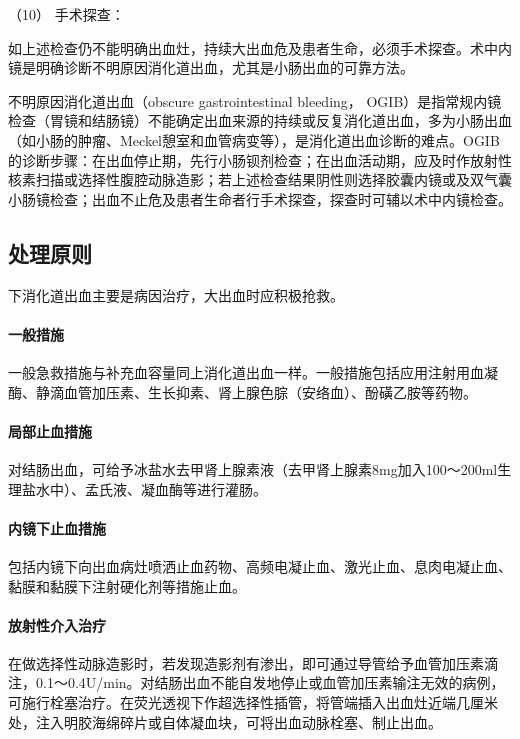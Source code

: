 \hypertarget{text00033.htmlux5cux23CHP1-13-2-1-5-10}{}
（10） 手术探查：

如上述检查仍不能明确出血灶，持续大出血危及患者生命，必须手术探查。术中内镜是明确诊断不明原因消化道出血，尤其是小肠出血的可靠方法。

不明原因消化道出血（obscure gastrointestinal bleeding，
OGIB）是指常规内镜检查（胃镜和结肠镜）不能确定出血来源的持续或反复消化道出血，多为小肠出血（如小肠的肿瘤、Meckel憩室和血管病变等），是消化道出血诊断的难点。OGIB的诊断步骤：在出血停止期，先行小肠钡剂检查；在出血活动期，应及时作放射性核素扫描或选择性腹腔动脉造影；若上述检查结果阴性则选择胶囊内镜或及双气囊小肠镜检查；出血不止危及患者生命者行手术探查，探查时可辅以术中内镜检查。

\subsection{处理原则}

下消化道出血主要是病因治疗，大出血时应积极抢救。

\paragraph{一般措施}

一般急救措施与补充血容量同上消化道出血一样。一般措施包括应用注射用血凝酶、静滴血管加压素、生长抑素、肾上腺色腙（安络血）、酚磺乙胺等药物。

\paragraph{局部止血措施}

对结肠出血，可给予冰盐水去甲肾上腺素液（去甲肾上腺素8mg加入100～200ml生理盐水中）、孟氏液、凝血酶等进行灌肠。

\paragraph{内镜下止血措施}

包括内镜下向出血病灶喷洒止血药物、高频电凝止血、激光止血、息肉电凝止血、黏膜和黏膜下注射硬化剂等措施止血。

\paragraph{放射性介入治疗}

在做选择性动脉造影时，若发现造影剂有渗出，即可通过导管给予血管加压素滴注，0.1～0.4U/min。对结肠出血不能自发地停止或血管加压素输注无效的病例，可施行栓塞治疗。在荧光透视下作超选择性插管，将管端插入出血灶近端几厘米处，注入明胶海绵碎片或自体凝血块，可将出血动脉栓塞、制止出血。

